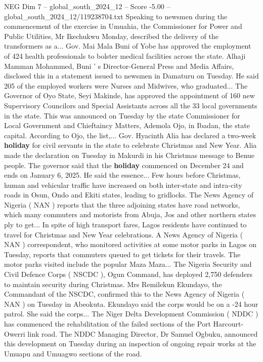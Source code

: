 \begin{textsample}{NEG Dim 7 – global\_south\_2024\_12 – Score -5.00 – global\_south\_2024\_12/119238704.txt}
Speaking to newsmen during the commencement of the exercise in Umuahia, the Commissioner for Power and Public Utilities, Mr Ikechukwu Monday, described the delivery of the transformers as a...
Gov.
Mai Mala Buni of Yobe has approved the employment of 424 health professionals to bolster medical facilities across the state.
Alhaji Mamman Mohammed, Buni ' s Director-General Press and Media Affairs, disclosed this in a statement issued to newsmen in Damaturu on Tuesday.
He said 205 of the employed workers were Nurses and Midwives, who graduated...
The Governor of Oyo State, Seyi Makinde, has approved the appointment of 160 new Supervisory Councilors and Special Assistants across all the 33 local governments in the state.
This was announced on Tuesday by the state Commissioner for Local Government and Chieftaincy Matters, Ademola Ojo, in Ibadan, the state capital.
According to Ojo, the list,...
Gov.
Hyacinth Alia has declared a two-week \textbf{holiday} for civil servants in the state to celebrate Christmas and New Year.
Alia made the declaration on Tuesday in Makurdi in his Christmas message to Benue people.
The governor said that the \textbf{holiday} commenced on December 24 and ends on January 6, 2025.
He said the essence...
Few hours before Christmas, human and vehicular traffic have increased on both inter-state and intra-city roads in Osun, Ondo and Ekiti states, leading to gridlocks.
The News Agency of Nigeria ( NAN ) reports that the three adjoining states have road networks, which many commuters and motorists from Abuja, Jos and other northern states ply to get...
In spite of high transport fares, Lagos residents have continued to travel for Christmas and New Year celebrations.
A News Agency of Nigeria ( NAN ) correspondent, who monitored activities at some motor parks in Lagos on Tuesday, reports that commuters queued to get tickets for their travels.
The motor parks visited include the popular Maza Maza...
The Nigeria Security and Civil Defence Corps ( NSCDC ), Ogun Command, has deployed 2,750 defenders to maintain security during Christmas.
Mrs Remilekun Ekundayo, the Commandant of the NSCDC, confirmed this to the News Agency of Nigeria ( NAN ) on Tuesday in Abeokuta.
Ekundayo said the corps would be on a -24 hour patrol.
She said the corps...
The Niger Delta Development Commission ( NDDC ) has commenced the rehabilitation of the failed sections of the Port Harcourt-Owerri link road.
The NDDC Managing Director, Dr Samuel Ogbuku, announced this development on Tuesday during an inspection of ongoing repair works at the Umuapu and Umuagwo sections of the road.

\end{textsample}

